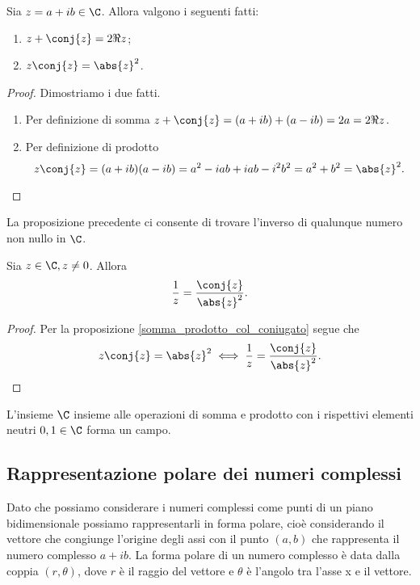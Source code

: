 \begin{proposition}\label{somma_prodotto_col_coniugato}
    Sia $z = a+ib \in \C$. Allora valgono i seguenti fatti:
    \begin{enumerate}[label={(\roman*)}]
        \item $z + \conj{z} = 2\Re{z}$;
        \item $z\conj{z} = \abs{z}^2$.
    \end{enumerate}
\end{proposition}
\begin{proof}
    Dimostriamo i due fatti.
    \begin{enumerate}[label={(\roman*)}]
        \item Per definizione di somma $z + \conj{z} = (a + ib) + (a - ib) = 2a = 2\Re z$.
        \item Per definizione di prodotto \[
            z\conj{z} = (a + ib)(a - ib) = a^2 - iab + iab - i^2b^2 = a^2 + b^2 = \abs{z}^2.\qedhere
        \] 
    \end{enumerate}
\end{proof}

La proposizione precedente ci consente di trovare l'inverso di qualunque numero non nullo in $\C$.

\begin{proposition}
    Sia $z \in \C, z \neq 0$. Allora \[\frac{1}{z} = \frac{\conj{z}}{\abs{z}^2}.\]
\end{proposition}
\begin{proof}
    Per la proposizione \ref{somma_prodotto_col_coniugato} segue che \[
        z\conj{z} = \abs{z}^2 \iff \frac{1}{z} = \frac{\conj{z}}{\abs{z}^2}. \qedhere   
    \]
\end{proof}

\begin{proposition}
    L'insieme $\C$ insieme alle operazioni di somma e prodotto con i rispettivi elementi neutri $0, 1 \in \C$ forma un campo.
\end{proposition}

\subsection{Rappresentazione polare dei numeri complessi}

Dato che possiamo considerare i numeri complessi come punti di un piano bidimensionale possiamo rappresentarli in forma polare, cioè considerando il vettore che congiunge l'origine degli assi con il punto $(a, b)$ che rappresenta il numero complesso $a + ib$. La forma polare di un numero complesso è data dalla coppia $(r, \theta)$, dove $r$ è il raggio del vettore e $\theta$ è l'angolo tra l'asse x e il vettore.

